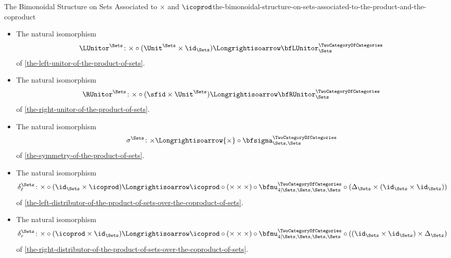 \begin{proposition}{The Bimonoidal Structure on Sets Associated to $\times$ and $\icoprod$}{the-bimonoidal-structure-on-sets-associated-to-the-product-and-the-coproduct}
\begin{itemize}
\[            \]
            of \cref{the-associator-of-the-product-of-sets}.
        \item{}The natural isomorphism
            \[
                \LUnitor^{\Sets}%
                \colon%
                {\times}\circ{(\Unit^{\Sets}\times\id_{\Sets})}
                \Longrightisoarrow
                \bfLUnitor^{\TwoCategoryOfCategories}_{\Sets}
            \]
            of \cref{the-left-unitor-of-the-product-of-sets}.
        \item{}The natural isomorphism
            \[
                \RUnitor^{\Sets}%
                \colon%
                {\times}\circ{({\sfid}\times{\Unit^{\Sets}})}%
                \Longrightisoarrow%
                \bfRUnitor^{\TwoCategoryOfCategories}_{\Sets}%
            \]
            of \cref{the-right-unitor-of-the-product-of-sets}.
        \item{}The natural isomorphism
            \[
                \sigma^{\Sets}
                \colon
                {\times}
                \Longrightisoarrow
                {\times}\circ{\bfsigma^{\TwoCategoryOfCategories}_{\Sets,\Sets}}
            \]
            of \cref{the-symmetry-of-the-product-of-sets}.
        \item{}The natural isomorphism
            \begingroup\footnotesize
            \[
                \delta^{\Sets}_{\ell}
                \colon
                \mathord{\times}\circ(\id_{\Sets}\times\mathord{\icoprod})
                \Longrightisoarrow
                \mathord{\icoprod}\circ(\mathord{\times}\times\mathord{\times})\circ\bfmu^{\TwoCategoryOfCategories}_{4|\Sets,\Sets,\Sets,\Sets}\circ(\Delta_{\Sets}\times(\id_{\Sets}\times\id_{\Sets}))
            \]%
            \endgroup
            of \cref{the-left-distributor-of-the-product-of-sets-over-the-coproduct-of-sets}.
        \item{}The natural isomorphism
            \begingroup\footnotesize
            \[
                \delta^{\Sets}_{r}
                \colon
                \mathord{\times}\circ(\mathord{\icoprod}\times\id_{\Sets})
                \Longrightisoarrow
                \mathord{\icoprod}\circ(\mathord{\times}\times\mathord{\times})\circ\bfmu^{\TwoCategoryOfCategories}_{4|\Sets,\Sets,\Sets,\Sets}\circ((\id_{\Sets}\times\id_{\Sets})\times\Delta_{\Sets})
            \]%
            \endgroup
            of \cref{the-right-distributor-of-the-product-of-sets-over-the-coproduct-of-sets}.

\end{itemize}
\end{proposition}
